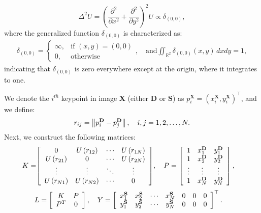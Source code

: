 \begin{equation}
\Delta^2 U=\left(\frac{\partial^2}{\partial x^2}+\frac{\partial^2}{\partial y^2}\right)^2 U \propto \delta_{(0,0)},
\end{equation}
where the generalized function \(\delta_{(0,0)}\) is characterized as:
\begin{align}
\delta_{(0,0)} = \begin{cases}
\infty, & \text{if } (x, y) = (0, 0) \\
0, & \text{otherwise}
\end{cases},\quad
\text{and} \iint_{\mathbb{R}^{2}} \delta_{(0,0)}(x, y) \,dx dy = 1,
\end{align}
indicating that \(\delta_{(0,0)}\) is zero everywhere except at the origin, where it integrates to one.

We denote the \(i^{th}\) keypoint in image \(\mathbf{X}\) (either \(\mathbf{D}\) or \(\mathbf{S}\)) as \(p^{\mathbf{X}}_i=(x^{\mathbf{X}}_i, y^{\mathbf{X}}_i)^{\top}\), and we define:
\begin{equation}
r_{ij} = \left\|p^{\mathbf{D}}_{i}-p^{\mathbf{D}}_{j}\right\|, \quad i,j=1,2,\ldots, N. \notag
\end{equation}
Next, we construct the following matrices:
\begin{equation}
\begin{aligned} 
K= & {\left[\begin{array}{cccc}0 & U\left(r_{12}\right) & \cdots & U\left(r_{1N}\right) \\
U\left(r_{21}\right) & 0 & \cdots & U\left(r_{2 N}\right) \\ \vdots & \vdots & \ddots & \vdots \\
U\left(r_{N 1}\right) & U\left(r_{N 2}\right) & \cdots & 0\end{array}\right] }, \quad
P =\left[\begin{array}{ccc}1 & x^{\mathbf{D}}_1 & y^{\mathbf{D}}_1 \\ 1 & x^{\mathbf{D}}_2 & y^{\mathbf{D}}_2 \\ \vdots & \vdots & \vdots \\ 1 & x^{\mathbf{D}}_N & y^{\mathbf{D}}_N\end{array}\right], \notag
\end{aligned}
\end{equation}
\begin{equation}
\begin{aligned}
L & =\left[\begin{array}{cc}K & P \\ P^T & 0\end{array}\right], \quad
Y = \left[\begin{array}{ccccccc} x^{\mathbf{S}}_1 & x^{\mathbf{S}}_2 & \cdots &  x^{\mathbf{S}}_N & 0 & 0 & 0 \\
y^{\mathbf{S}}_1 & y^{\mathbf{S}}_2 & \cdots &  y^{\mathbf{S}}_N & 0 & 0 & 0 \\
\end{array}\right]^{\top}. \notag
\end{aligned}
\end{equation}
